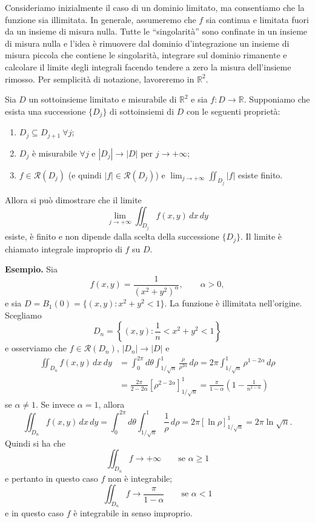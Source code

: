 \documentclass[11pt,a4paper]{article}
\newcommand{\R}{\mathbb{R}}
\begin{document}
Consideriamo inizialmente il caso di un dominio limitato, ma consentiamo che la funzione sia illimitata. In generale, assumeremo che $f$ sia continua e limitata fuori da un insieme di misura nulla. Tutte le ``singolarità'' sono confinate in un insieme di misura nulla e l'idea è rimuovere dal dominio d'integrazione un insieme di misura piccola che contiene le singolarità, integrare sul dominio rimanente e calcolare il limite degli integrali facendo tendere a zero la misura dell'insieme rimosso. Per semplicità di notazione, lavoreremo in $\R^2$.

Sia $D$ un sottoinsieme limitato e misurabile di $\R^2$ e sia $f:D\to\R$. Supponiamo che esista una successione $\{D_j\}$ di sottoinsiemi di $D$ con le seguenti proprietà:
\begin{enumerate}
\item $D_j\subseteq D_{j+1}\ \forall j$;
\item $D_j$ è misurabile $\forall j$ e $|D_j|\to|D|$ per $j\to+\infty$;
\item $f\in\mathcal{R}(D_j)$ (e quindi $|f|\in\mathcal{R}(D_j)$) e $\displaystyle\lim_{j\to+\infty}\iint_{D_j}|f|$ esiste finito.
\end{enumerate}
Allora si può dimostrare che il limite
\[
\lim_{j\to+\infty}\iint_{D_j}f(x,y)\,dx\,dy
\]
esiste, è finito e non dipende dalla scelta della successione $\{D_j\}$. Il limite è chiamato integrale improprio di $f$ su $D$.

\noindent\textbf{Esempio.} Sia
\[
f(x,y)=\frac{1}{(x^2+y^2)^\alpha},\qquad \alpha>0,
\]
e sia $D=B_1(0)=\{(x,y):x^2+y^2<1\}$. La funzione è illimitata nell'origine. Scegliamo
\[
D_n=\left\{(x,y):\frac1n<x^2+y^2<1\right\}
\]
e osserviamo che $f\in\mathcal{R}(D_n)$, $|D_n|\to|D|$ e
\begin{align*}
\iint_{D_n}f(x,y)\,dx\,dy
&=\int_0^{2\pi}d\theta\int_{1/\sqrt n}^{1}\frac{\rho}{\rho^{2\alpha}}\,d\rho
=2\pi\int_{1/\sqrt n}^{1}\rho^{1-2\alpha}\,d\rho\\
&=\frac{2\pi}{2-2\alpha}\left[\rho^{2-2\alpha}\right]_{1/\sqrt n}^{1}
=\frac{\pi}{1-\alpha}\left(1-\frac{1}{n^{1-\alpha}}\right)
\end{align*}
se $\alpha\neq1$. Se invece $\alpha=1$, allora
\[
\iint_{D_n}f(x,y)\,dx\,dy
=\int_0^{2\pi}d\theta\int_{1/\sqrt n}^{1}\frac1\rho\,d\rho
=2\pi[\ln\rho]_{1/\sqrt n}^{1}
=2\pi\ln\sqrt n.
\]
Quindi si ha che
\[
\iint_{D_n}f\to+\infty\qquad\text{se }\alpha\ge1
\]
e pertanto in questo caso $f$ non è integrabile;
\[
\iint_{D_n}f\to\frac{\pi}{1-\alpha}\qquad\text{se }\alpha<1
\]
e in questo caso $f$ è integrabile in senso improprio.
\end{document}
